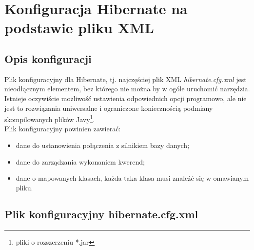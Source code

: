 \chapter{Konfiguracja Hibernate na podstawie pliku XML}
\label{ca:hibernatecfg}
	
	\section{Opis konfiguracji}
		Plik konfiguracyjny dla Hibernate, tj. najczęściej plik XML \textit{hibernate.cfg.xml}
		jest nieodłącznym elementem, bez którego nie można by w ogóle uruchomić narzędzia. 
		Istnieje oczywiście możliwość ustawienia odpowiednich opcji programowo, ale 
		nie jest to rozwiązania uniwersalne i ograniczone koniecznością podmiany
		skompilowanych plików Javy\footnote{pliki o rozszerzeniu *.jar}. \\
		Plik konfiguracyjny powinien zawierać:
		\begin{itemize}
			\item dane do ustanowienia połączenia z silnikiem bazy danych;
			\item dane do zarządzania wykonaniem kwerend;
			\item dane o mapowanych klasach, każda taka klasa musi znaleźć się w omawianym pliku.
		\end{itemize}
	
	\section{Plik konfiguracyjny hibernate.cfg.xml}
